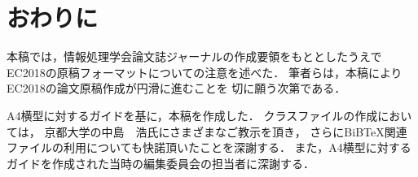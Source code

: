 \section{おわりに}

本稿では，情報処理学会論文誌ジャーナルの作成要領をもととしたうえで
EC2018の原稿フォーマットについての注意を述べた．
筆者らは，本稿によりEC2018の論文原稿作成が円滑に進むことを
切に願う次第である．



\begin{acknowledgment}
A4横型に対するガイドを基に，本稿を作成した．
クラスファイルの作成においては，
京都大学の中島　浩氏にさまざまなご教示を頂き，
さらにBiB\TeX 関連ファイルの利用についても快諾頂いたことを深謝する．
また，A4横型に対するガイドを作成された当時の編集委員会の担当者に深謝する．
\end{acknowledgment}

